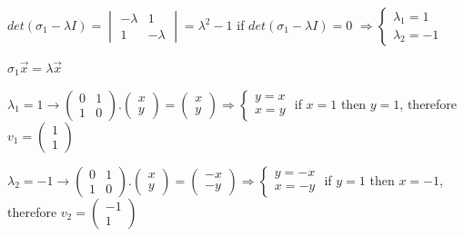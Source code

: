 \documentclass[fleqn]{article}
\begin{document}
\begin{enumerate}
      \textcolor{hwColor}{ 
        $det(\sigma_1-\lambda I)=
          \begin{vmatrix}
            -\lambda & 1 \\
            1 & -\lambda
          \end{vmatrix}= \lambda^2-1
        $
        if $det(\sigma_1-\lambda I)=0$ 
        $
          \Longrightarrow
          \begin{cases}
            \lambda_1=1 \\
            \lambda_2=-1
          \end{cases}
        $
      }

      \textcolor{hwColor}{ $\sigma_1 \overrightarrow{x}=\lambda \overrightarrow{x}$ }

      \textcolor{hwColor}{ 
       $
       \lambda_1=1  \rightarrow 
       \begin{pmatrix}
        0 & 1 \\
        1 & 0  
       \end{pmatrix}.\begin{pmatrix}
         x \\
         y
       \end{pmatrix}=\begin{pmatrix}
         x \\
         y
       \end{pmatrix}
       \Longrightarrow 
       \begin{cases}
         y=x \\
         x=y
       \end{cases}
       $
       if $x=1$ then $y=1$, therefore $v_1=\begin{pmatrix}
         1 \\
         1
       \end{pmatrix}$
      }

      \textcolor{hwColor}{ 
        $
        \lambda_2=-1  \rightarrow 
        \begin{pmatrix}
         0 & 1 \\
         1 & 0  
        \end{pmatrix}.\begin{pmatrix}
          x \\
          y
        \end{pmatrix}=\begin{pmatrix}
          -x \\
          -y
        \end{pmatrix}
        \Longrightarrow 
        \begin{cases}
          y=-x \\
          x=-y
        \end{cases}
        $
        if $y=1$ then $x=-1$, therefore $v_2=\begin{pmatrix}
          -1 \\
          1
        \end{pmatrix}$
       }


\end{enumerate}
\end{document}
